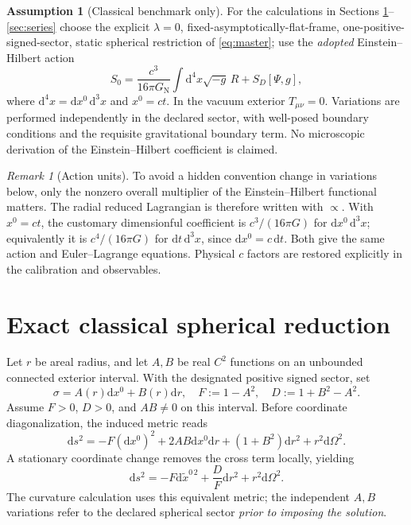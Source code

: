 \documentclass[11pt,a4paper,oneside]{report}
\numberwithin{equation}{chapter}
\theoremstyle{definition}\newtheorem{definition}[theorem]{Definition}
\newtheorem{assumption}[theorem]{Assumption}
\theoremstyle{remark}\newtheorem{remark}[theorem]{Remark}
\newcommand{\dd}{\mathrm d}
\newcommand{\GNewton}{G_{\mathrm N}}
\begin{document}
\begin{assumption}[Classical benchmark only]\label{ass:benchmark}
For the calculations in Sections \ref{sec:static}--\ref{sec:series} choose the explicit $\lambda=0$, fixed-asymptotically-flat-frame, one-positive-signed-sector, static spherical restriction of \eqref{eq:master}; use the \emph{adopted} Einstein--Hilbert action
\begin{equation}
 S_0=\frac{c^3}{16\pi\GNewton}\int\dd^4x\sqrt{-g}\,R
 +S_D[\Psi,g],
 \label{eq:action}
\end{equation}
where $\dd^4x=\dd x^0\,\dd^3x$ and $x^0=ct$. In the vacuum exterior $T_{\mu\nu}=0$. Variations are performed independently in the declared sector, with well-posed boundary conditions and the requisite gravitational boundary term. No microscopic derivation of the Einstein--Hilbert coefficient is claimed.
\end{assumption}

\begin{remark}[Action units]
To avoid a hidden convention change in variations below, only the nonzero overall multiplier of the Einstein--Hilbert functional matters. The radial reduced Lagrangian is therefore written with $\propto$. With $x^0=ct$, the customary dimensionful coefficient is $c^3/(16\pi G)$ for $\dd x^0\,\dd^3x$; equivalently it is $c^4/(16\pi G)$ for $\dd t\,\dd^3x$, since $\dd x^0=c\,\dd t$. Both give the same action and Euler--Lagrange equations. Physical $c$ factors are restored explicitly in the calibration and observables.
\end{remark}

\section{Exact classical spherical reduction}\label{sec:static}
Let $r$ be areal radius, and let $A,B$ be real $C^2$ functions on an unbounded connected exterior interval. With the designated positive signed sector, set
\begin{equation}
 \sigma=A(r)\dd x^0+B(r)\dd r,\quad
 F:=1-A^2,\quad D:=1+B^2-A^2.
 \label{eq:AB}
\end{equation}
Assume $F>0$, $D>0$, and $AB\ne0$ on this interval. Before coordinate diagonalization, the induced metric reads
\begin{equation}
 \dd s^2=-F(\dd x^0)^2+2AB\dd x^0\dd r
 +(1+B^2)\dd r^2+r^2\dd\Omega^2.
 \label{eq:crossmetric}
\end{equation}
A stationary coordinate change removes the cross term locally, yielding
\begin{equation}
 \dd s^2=-F\dd\widetilde x^{0\,2}+\frac DF\dd r^2+r^2\dd\Omega^2.
 \label{eq:diagmetric}
\end{equation}
The curvature calculation uses this equivalent metric; the independent $A,B$ variations refer to the declared spherical sector \emph{prior to imposing the solution}.
\end{document}

